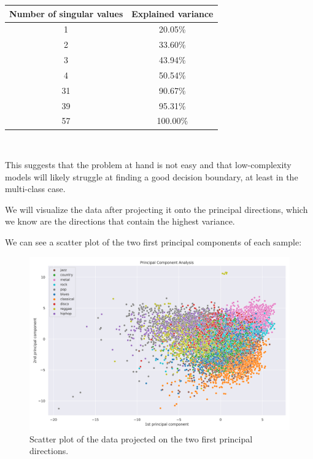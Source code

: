 \documentclass{Configuration_Files/PoliMi3i_thesis}
\begin{document}
\begin{table}[H]
    \centering 
    \begin{tabular}{|c | c |}
    \hline
    \rowcolor{bluepoli!40} 
     Number of singular values & Explained variance \T\B \\
    \hline \hline
    1 & 20.05\%     \T\B \\
    2 & 33.60\%     \T\B \\
    3 & 43.94\%     \T\B  \\
    4 & 50.54\%     \T\B  \\
    31 & 90.67\%   \T\B  \\
    39 & 95.31\%    \T\B  \\
    57 & 100.00\%  \T\B  \\
    \hline
    \end{tabular}
    \\[10pt]
\end{table}

This suggests that the problem at hand is not easy and that low-complexity models will likely struggle at finding a good decision boundary, at least in the multi-class case. 

We will visualize the data after projecting it onto the principal directions, which we know are the directions that contain the highest variance. 

We can see a scatter plot of the two first principal components of each sample:
\begin{figure}[H]
    \centering
    \includegraphics[width=\textwidth]{Figures/pca_2d.png}
    \caption{Scatter plot of the data projected on the two first principal directions.}
    \label{fig:pca2d}
\end{figure}
\end{document}
